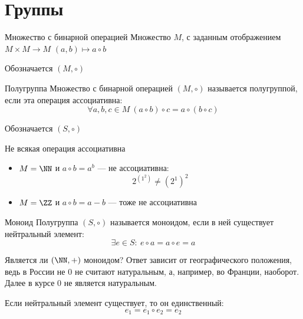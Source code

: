 \section{Группы}

\begin{defn}{Множество с бинарной операцией}{}
    Множество \( M \), с заданным отображением \( M \times M \to M \) \( (a, b) \mapsto a \circ b \)

    Обозначается \( (M, \circ) \)
\end{defn}

\begin{defn}{Полугруппа}{}
    Множество с бинарной операцией \( (M, \circ) \) называется полугруппой,
    если эта операция ассоциативна:
    \[
        \forall a, b, c \in M \ (a \circ b) \circ c = a \circ (b \circ c)
    \]

    Обозначается \( (S, \circ) \)
\end{defn}

\begin{example}{Не всякая операция ассоциативна}{}
    \begin{itemize}
        \item
            \( M = \NN \) и \( a \circ b = a^b \) --- не ассоциативна:
            \[
                2^{(1^2)} \neq (2^1)^2
            \]
        \item
            \( M = \ZZ \) и \( a \circ b = a - b \) --- тоже не ассоциативна
    \end{itemize}
\end{example}

\begin{defn}{Моноид}{}
    Полугруппа \( (S, \circ) \) называется моноидом,
    если в ней существует нейтральный элемент:
    \[
        \exists e \in S: \ e \circ a = a \circ e = a
    \]
\end{defn}

\begin{example}{}{}
    Является ли \( (\NN, +) \) моноидом?
    Ответ зависит от географического положения,
    ведь в России не \( 0 \) не считают натуральным,
    а, например, во Франции, наоборот.
    Далее в курсе \( 0 \) не является натуральным.
\end{example}

\begin{remark}{}{}
    Если нейтральный элемент существует, то он единственный:
    \[
        e_1 = e_1 \circ e_2 = e_2
    \]
\end{remark}

